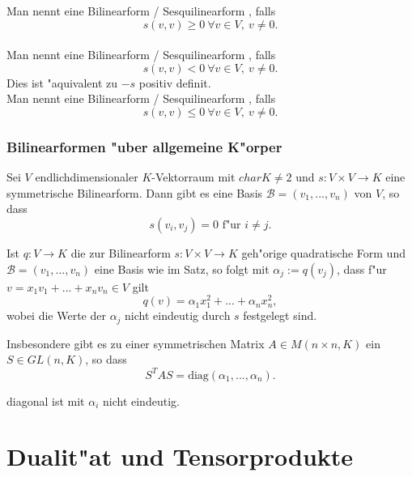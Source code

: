 \documentclass[9pt, a4paper, twocolumn, landscape]{article}
\newcommand{\comment}[1]{}
\begin{document}
\begin{definition}
Man nennt eine Bilinearform / Sesquilinearform , falls 
$$
s(v,v) \geq 0 \ \forall v \in V, \ v \neq 0.
$$
\\
Man nennt eine Bilinearform / Sesquilinearform , falls 
$$
s(v,v) < 0 \ \forall  v \in V, \ v \neq 0.
$$
Dies ist "aquivalent zu $-s$ positiv definit.
\\
Man nennt eine Bilinearform / Sesquilinearform , falls 
$$
s(v,v) \leq 0 \  \forall v \in V, \ v \neq 0.
$$
\end{definition}

\subsubsection{Bilinearformen "uber allgemeine K"orper}
\begin{theorem} 
Sei $V$ endlichdimensionaler $K$-Vektorraum mit $char K \neq 2$ und $s : V \times V \rightarrow K$ eine symmetrische Bilinearform. Dann gibt es eine Basis $\mathcal{B} = (v_1, ..., v_n)$ von $V$, so dass
$$
s(v_i, v_j) = 0 \text{ f"ur } i \neq j.
$$
\end{theorem}

\begin{corollary}
Ist $q : V \rightarrow K$ die zur Bilinearform $s : V \times V \rightarrow K$ geh"orige quadratische Form und $\mathcal{B} = (v_1, ... , v_n)$ eine Basis wie im Satz, so folgt mit $\alpha_j := q(v_j)$, dass f"ur $v = x_1 v_1 + ... + x_n v_n \in V$ gilt 
$$
q(v) = \alpha_1 x_1^2 + ... + \alpha_n x_n^2,
$$
wobei die Werte der $\alpha_j$ nicht eindeutig durch $s$ festgelegt sind.

Insbesondere gibt es zu einer symmetrischen Matrix $A \in M(n \times n, K)$ ein $S \in GL(n, K)$, so dass 
$$
S^T A S = \mathrm{diag}(\alpha_1, ..., \alpha_n).
$$
\comment{\left(\begin{array}{ccc}\alpha_{1} & & 0 
\\ & \ddots & 
\\ 0 & & \alpha_{n}\end{array}\right) = D
}
diagonal ist mit $\alpha_i$ nicht eindeutig.
\end{corollary}







\section{Dualit"at und Tensorprodukte}
\end{document}
